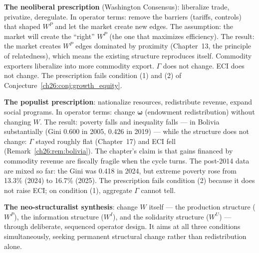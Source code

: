 \documentclass[../structural_economics_book.tex]{subfiles}
\begin{document}
\begin{remark}\label{ch26:prop:insufficiency}
\textbf{The neoliberal prescription} (Washington Consensus): liberalize trade, privatize, deregulate. In operator terms: remove the barriers (tariffs, controls) that shaped $W^P$ and let the market create new edges. The assumption: the market will create the ``right'' $W^P$ (the one that maximizes efficiency). The result: the market creates $W^P$ edges dominated by proximity (Chapter~13, the principle of relatedness), which means the existing structure reproduces itself. Commodity exporters liberalize into more commodity export. $\Gamma$ does not change. ECI does not change. The prescription fails condition (1) and (2) of Conjecture~\ref{ch26:conj:growth_equity}.

\textbf{The populist prescription}: nationalize resources, redistribute revenue, expand social programs. In operator terms: change $\boldsymbol{\omega}$ (endowment redistribution) without changing $W$. The result: poverty falls and inequality falls --- in Bolivia substantially (Gini 0.600 in 2005, 0.426 in 2019) --- while the structure does not change: $\Gamma$ stayed roughly flat (Chapter~17) and ECI fell (Remark~\ref{ch26:rem:bolivia}). The chapter's claim is that gains financed by commodity revenue are fiscally fragile when the cycle turns. The post-2014 data are mixed so far: the Gini was 0.418 in 2024, but extreme poverty rose from 13.3\% (2024) to 16.7\% (2025). The prescription fails condition (2) because it does not raise ECI; on condition (1), aggregate $\Gamma$ cannot tell.

\textbf{The neo-structuralist synthesis}: change $W$ itself --- the production structure ($W^P$), the information structure ($W^I$), and the solidarity structure ($W^U$) --- through deliberate, sequenced operator design. It aims at all three conditions simultaneously, seeking permanent structural change rather than redistribution alone.
\end{remark}
\end{document}
